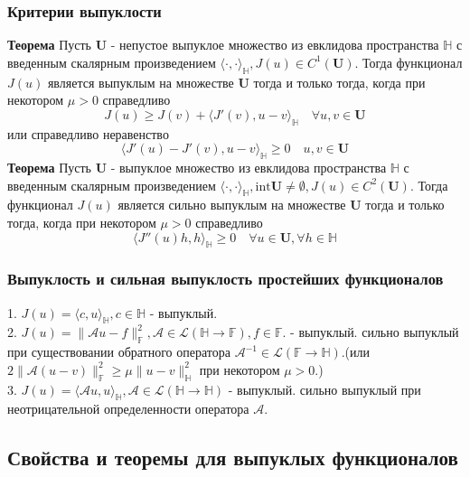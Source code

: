 \documentclass[A4]{article}
\begin{document}
\subsubsection{Критерии выпуклости}
\textbf{Теорема} Пусть $\mathbf{U}$ - непустое выпуклое множество из евклидова пространства $\mathbb{H}$ с введенным скалярным произведением $\langle\cdot,\cdot\rangle_{\mathbb{H}},J(u)\in C^1(\mathbf{U})$. Тогда функционал $J(u)$ является выпуклым на множестве $\mathbf{U}$ тогда и только тогда, когда при некотором $\mu>0$ справедливо 
\begin{equation*}
J(u)\geqslant J(v)+\langle J'(v),u-v\rangle_{\mathbb{H}} \quad\forall u,v\in\mathbf{U}
\end{equation*}
или справедливо неравенство
\begin{equation*}
\langle J'(u)-J'(v),u-v\rangle_{\mathbb{H}}\geqslant 0 \quad u,v\in\mathbf{U}
\end{equation*}
\textbf{Теорема} Пусть $\mathbf{U}$ - выпуклое множество из евклидова пространства $\mathbb{H}$ с введенным скалярным произведением $\langle\cdot,\cdot\rangle_{\mathbb{H}},\text{int}\mathbf{U}\ne\emptyset,J(u)\in C^2(\mathbf{U})$. Тогда функционал $J(u)$ является сильно выпуклым на множестве $\mathbf{U}$ тогда и только тогда, когда при некотором $\mu>0$ справедливо 
\begin{equation*}
\langle J''(u)h,h\rangle_{\mathbb{H}}\geqslant 0\quad\forall u\in\mathbf{U},\forall h\in\mathbb{H}
\end{equation*}
\subsubsection{Выпуклость и сильная выпуклость простейших функционалов}
1. $J(u)=\langle c,u\rangle_{\mathbb{H}},c\in\mathbb{H}$ - выпуклый.\\
2. $J(u)=\|\mathcal{A}u-f\|^2_{\mathbb{F}},\mathcal{A}\in\mathcal{L}(\mathbb{H}\rightarrow\mathbb{F}),f\in\mathbb{F}.$ - выпуклый. сильно выпуклый при существовании обратного оператора $\mathcal{A}^{-1}\in\mathcal{L}(\mathbb{F}\rightarrow\mathbb{H})$.(или $2\|\mathcal{A}(u-v)\|^2_{\mathbb{F}}\geqslant\mu\|u-v\|^2_{\mathbb{H}}$ при некотором $\mu>0$.)\\
3. $J(u)=\langle\mathcal{A}u,u\rangle_{\mathbb{H}},\mathcal{A}\in\mathcal{L}(\mathbb{H}\rightarrow\mathbb{H})$ - выпуклый. сильно выпуклый при неотрицательной определенности оператора $\mathcal{A}$.
\subsection{Свойства и теоремы для выпуклых функционалов}
\end{document}
